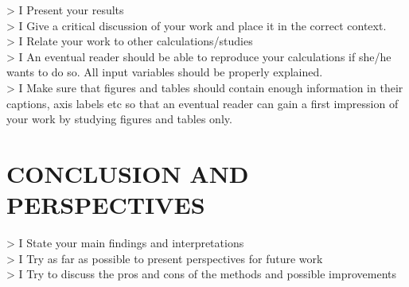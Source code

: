 \documentclass[11pt,english,a4paper]{article}
\begin{document}
> I Present your results\\
> I Give a critical discussion of your work and place it in the correct context.\\
> I Relate your work to other calculations/studies\\
> I An eventual reader should be able to reproduce your calculations if she/he wants to do so. All input variables should be properly explained.\\
> I Make sure that figures and tables should contain enough information in their captions, axis labels etc so that an eventual reader can gain a first impression of your work by studying figures and tables only.
\section*{\uppercase{Conclusion and perspectives}}
> I State your main findings and interpretations\\
> I Try as far as possible to present perspectives for future work\\
> I Try to discuss the pros and cons of the methods and possible improvements

\printbibliography
\end{document}
